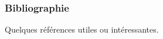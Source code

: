 \begin{frame}
  \frametitle{Bibliographie}

  Quelques références utiles ou intéressantes.
  \nocite{MASS, %
    Goulet:introR:2016, %
    Sussman:scheme:1996,
    Venables:s:2000,
    Braun:Rprogramming:2e:2016,
    Ihaka:R:1996}
  
\end{frame}

